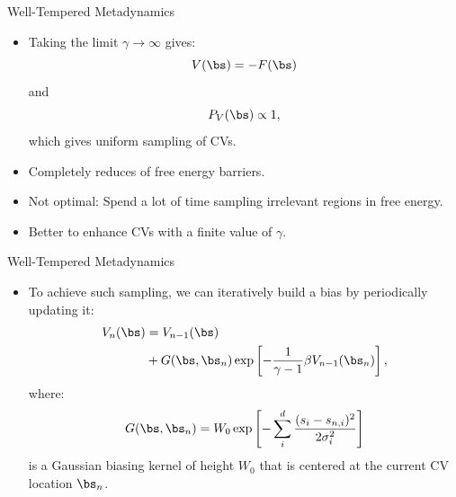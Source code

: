 \documentclass[10pt]{beamer}
\begin{document}
\begin{frame}{Well-Tempered Metadynamics}
\begin{itemize}
\setlength\itemsep{1em}
  \item Taking the limit $\gamma\to\infty$ gives:
  \begin{equation}
    V(\bs) = -F(\bs)
  \end{equation}
  and
  \begin{equation}
    P_V(\bs) \propto 1,
  \end{equation}
  which gives uniform sampling of CVs.

  \item Completely reduces of free energy barriers.

  \item Not optimal: Spend a lot of time sampling irrelevant regions in free energy.

  \item Better to enhance CVs with a finite value of $\gamma$.
\end{itemize}
\end{frame}

\begin{frame}{Well-Tempered Metadynamics}
\begin{itemize}
\setlength\itemsep{1em}
  \item To achieve such sampling, we can iteratively build a bias by periodically updating it:
  \begin{align}
    V_n(\bs) &= V_{n-1}(\bs) \nonumber\\
             &+ G(\bs,\bs_n)\exp\left[ -\frac{1}{\gamma-1}\beta V_{n-1}(\bs_n) \right],
  \end{align}
  where:
  \begin{equation}
    G(\bs,\bs_n) = W_0 \exp\left[ -\sum_i^d \frac{(s_i-s_{n,i})^2}{2\sigma^2_i} \right]
  \end{equation}
  is a Gaussian biasing kernel of height $W_0$ that is centered at the current CV location $\bs_n$.
\end{itemize}
\end{frame}
\end{document}
